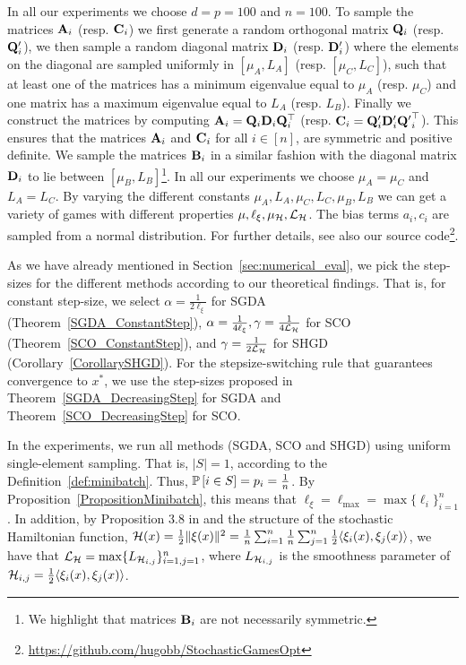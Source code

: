 \documentclass{article}
\begin{document}
In all our experiments we choose $d = p = 100$ and $n=100$. To sample the matrices $\mathbf{A}_i$ (resp. $\mathbf{C}_i$) we first generate a random orthogonal matrix $\mathbf{Q}_i$ (resp. $\mathbf{Q}'_i$), we then sample a random diagonal matrix $\mathbf{D}_i$ (resp. $\mathbf{D}'_i$) where the elements on the diagonal are sampled uniformly in $[\mu_A, L_A]$ (resp. $[\mu_C, L_C]$), such that at least one of the matrices has a minimum eigenvalue equal to $\mu_A$ (resp. $\mu_C$) and one matrix has a maximum eigenvalue equal to $L_A$ (resp. $L_B$).  Finally we construct the matrices by computing $\mathbf{A}_i=\mathbf{Q}_i\mathbf{D}_i\mathbf{Q}_i^\top$ (resp. $\mathbf{C}_i = \mathbf{Q}'_i\mathbf{D}'_i{\mathbf{Q}'}_i^\top$). This ensures that the matrices $\mathbf{A}_i$ and $\mathbf{C}_i$ for all $i \in [n]$, are symmetric and positive definite. We sample the matrices $\mathbf{B}_i$ in a similar fashion with the diagonal matrix $\mathbf{D}_i$ to lie between $[\mu_B, L_B]$\footnote{We highlight that matrices $\mathbf{B}_i$ are not necessarily symmetric.}. In all our experiments we choose $\mu_A=\mu_C$ and $L_A=L_C$. By varying the different constants $\mu_A, L_A, \mu_C, L_C, \mu_B, L_B$ we can get a variety of games with different properties $\mu, \ell_\xi, \mu_{{\cal H}}, {\cal L}_{{\cal H}}$. The bias terms $a_i, c_i$ are sampled from a normal distribution. For further details, see also our source code\footnote{\url{https://github.com/hugobb/StochasticGamesOpt}}. 


As we have already mentioned in Section~\ref{sec:numerical_eval}, we pick the step-sizes for the different methods according to our theoretical findings. That is, for constant step-size, we select $\alpha=\frac{1}{2\ell_\xi}$ for SGDA (Theorem~\ref{SGDA_ConstantStep}), $\alpha=\frac{1}{4\ell_\xi}, \gamma=\frac{1}{4{\cal L}_{{\cal H}}}$ for SCO (Theorem~\ref{SCO_ConstantStep}), and $\gamma=\frac{1}{2{\cal L}_{{\cal H}}}$ for SHGD (Corollary~\ref{CorollarySHGD}). For the stepsize-switching rule that guarantees convergence to $x^*$, we use the step-sizes proposed in Theorem~\ref{SGDA_DecreasingStep} for SGDA and Theorem~\ref{SCO_DecreasingStep} for SCO.

In the experiments, we run all methods (SGDA, SCO and SHGD) using uniform single-element sampling. That is, 
$|S|=1$, according to the Definition~\ref{def:minibatch}. Thus, $\mathbb{P} \left[ i\in S\right] = p_i = \frac{1}{n}$. By Proposition~\ref{PropositionMinibatch}, this means that  $\ell_\xi =\ell_{\max}=\max \{\ell_i\}_{i=1}^n$. In addition, by Proposition 3.8 in \cite{gower2019sgd} and the structure of the stochastic Hamiltonian function, ${\cal H}(x)= \frac{1}{2} \|\xi(x)\|^2 = \frac{1}{n} \sum_{i=1}^n \frac{1}{n} \sum_{j=1}^n \frac{1}{2} \langle  \xi_i(x),  \xi_j(x)\rangle$, we have that ${\cal L}_{{\cal H}}=\max\{L_{{\cal H}_{i,j}}\}_{i=1, j=1}^n$, where $L_{{\cal H}_{i,j}}$ is the smoothness parameter of ${\cal H}_{i,j}= \frac{1}{2} \langle  \xi_i(x),  \xi_j(x)\rangle$. 
\end{document}
